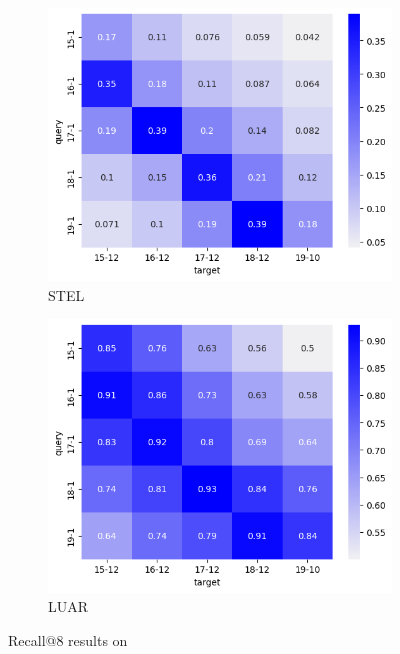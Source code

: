 \begin{figure}[ht]
    
    \begin{subfigure}{0.48\linewidth}
    \includegraphics[width=\linewidth]{stylometryExtensions/figures/heat/stel.png}
    \caption{STEL}
    \label{fig:tempral_vary:stel}
    \end{subfigure}
    \begin{subfigure}{0.48\linewidth}
    \includegraphics[width=\linewidth]{stylometryExtensions/figures/heat/luar.png}
    \caption{LUAR}
    \label{fig:tempral_vary:LUAR}
    \end{subfigure}

    \caption{Recall@8 results on \DSvarydelta{}}
    \label{fig:temporal_vary}
\end{figure}

